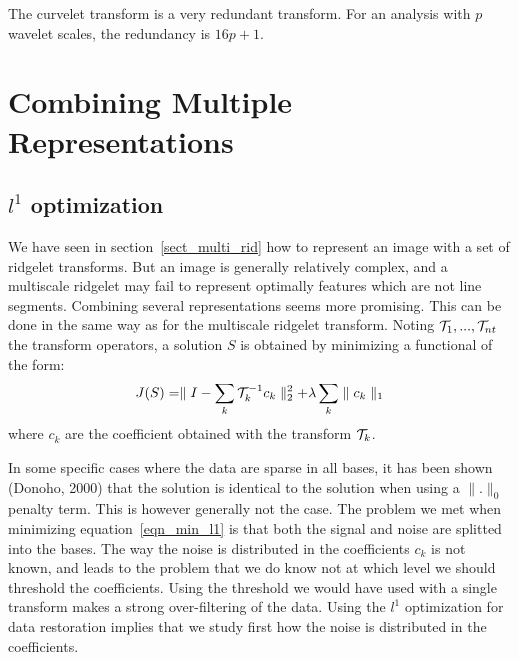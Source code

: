 \documentclass[11pt,a4paper]{article}
\begin{document}
The curvelet transform is a very redundant transform. For an analysis 
with $p$ wavelet scales, the redundancy is $16p+1$. 

\section{Combining Multiple Representations}
\label{sect_multi_rep}
\subsection{$l^1$ optimization}
We have seen in section~\ref{sect_multi_rid} how to represent an image
with a set of ridgelet transforms. But an image is generally relatively complex,
and a multiscale ridgelet may fail to represent optimally features 
which are not line segments. 
Combining several representations seems more promising. This can be done
in the same way as for the multiscale ridgelet transform.  Noting
${\cal T}_1, ..., {\cal T}_{nt}$ the transform operators, a solution $S$  
is obtained by minimizing a functional of the form:
\begin{eqnarray}
J(S) = \parallel I - \sum_k {\cal T}_k^{-1} c_k  \parallel_2^2 + \lambda \sum_k \parallel c_k \parallel_1
\label{eqn_min_l1}
\end{eqnarray}
where $c_k$ are the coefficient obtained with the transform ${\cal T}_k$.

In some specific cases where the data are sparse in all bases, 
it has been shown (Donoho, 2000)   
that the solution is identical to the solution when using a 
$\parallel . \parallel_0$ penalty term. This is however generally not the 
case. The problem we met when minimizing equation~\ref{eqn_min_l1} is 
that both the signal and noise are splitted into the bases. The way the noise
is distributed in the coefficients $c_k$ is not known, and leads to the problem
that we do know not at which level we should threshold the coefficients. Using
the threshold we would have used with a single transform 
makes a strong over-filtering of the data. Using the $l^1$ optimization 
for data restoration implies that we study first how the noise is 
distributed in the coefficients.
\end{document}
